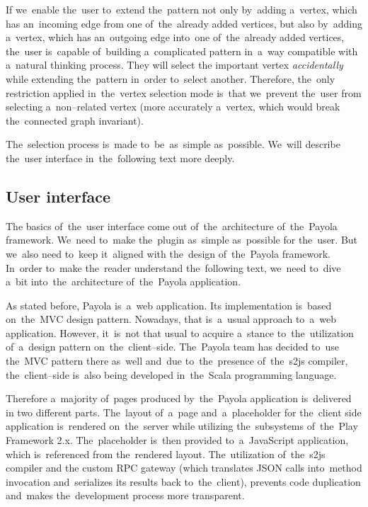 If we~enable the~user to~extend the~pattern not only by~adding a~vertex, 
which has an~incoming edge from one of~the~already added vertices, but also by~adding 
a~vertex, which has an~outgoing edge into~one of~the~already added vertices, 
the~user is~capable of~building a~complicated pattern in~a~way compatible with a~natural thinking process.
They will select the
important vertex \emph{accidentally} while extending the~pattern in~order to~select another. Therefore, the~only restriction 
applied in~the~vertex selection mode is~that we~prevent the~user from selecting 
a~non--related vertex (more accurately a~vertex, which would break the~connected 
graph invariant).

The~selection process is~made to~be~as~simple as~possible. We~will describe the~user interface in~the~following text more deeply.

\subsection{User interface}
The basics of~the~user interface come out of~the~architecture of~the~Payola 
framework. We~need to~make the~plugin as~simple as~possible for the~user. But we~also need to~keep it~aligned with the~design of~the~Payola framework. In~order to~make the~reader understand the~following text, we~need to~dive a~bit into~the~architecture of~the~Payola application.

As stated before, Payola is~a~web application. Its implementation is~based on~the~MVC 
design pattern. Nowadays, that is~a~usual approach to~a~web application. However, it~is~not that usual 
to acquire a~stance to~the~utilization of~a~design pattern on~the~client--side. The~Payola team has decided to~use the~MVC pattern there as~well and~due to~the~presence of~the~s2js compiler, the~client--side is~also being developed in~the~Scala programming language.

Therefore a~majority of~pages produced by~the~Payola application is~delivered 
in two different parts. The~layout of~a~page and~a~placeholder for the~client 
side application is~rendered on~the~server while utilizing the~subsystems of~the~Play Framework 2.x. The~placeholder is~then provided to~a~JavaScript application,
which is~referenced from the~rendered layout. The~utilization of~the~s2js compiler and
the custom RPC gateway (which translates JSON calls into~method invocation and~serializes its results
back to~the~client), prevents code duplication and~makes the~development process more transparent.

